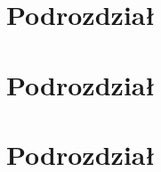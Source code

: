  \label{chap:conclusions}

\section{Podrozdział}

\bt

\section{Podrozdział}

\bt

\section{Podrozdział}

\bt
